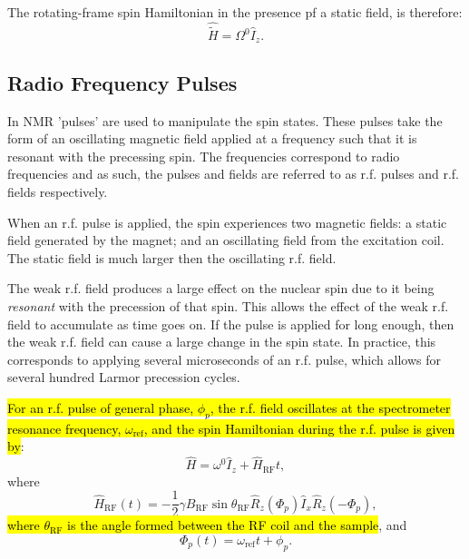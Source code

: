 The rotating-frame spin Hamiltonian in the presence pf a static field, is therefore:
\begin{equation}
  \hat{\tilde{H}} = \Omega^0\hat{I}_z.
\end{equation}

\subsection{Radio Frequency Pulses}

In NMR 'pulses' are used to manipulate the spin states. These pulses take the form
of an oscillating magnetic field applied at a frequency such that it is resonant with
the precessing spin. The frequencies correspond to radio frequencies and as such, the pulses and
fields are referred to as r.f. pulses and r.f. fields respectively.

When an r.f. pulse is applied, the spin experiences two magnetic fields: a static field generated
by the magnet; and an oscillating field from the excitation coil. The static field is much larger
then the oscillating r.f. field.

The weak r.f. field produces a large effect on the nuclear spin due to it being \textit{resonant}
with the precession of that spin. This allows the effect of the weak r.f. field to accumulate
as time goes on. If the pulse is applied for long enough, then the weak r.f. field can cause a
large change in the spin state. In practice, this corresponds to applying several microseconds
of an r.f. pulse, which allows for several hundred Larmor precession cycles.

\hl{For an r.f. pulse of general  phase, $\phi_p$, the r.f. field oscillates at the spectrometer resonance frequency, $\omega_{\text{ref}}$, and the spin Hamiltonian
during the r.f. pulse is given by}:
\begin{equation}
  \hat{H} = \omega^0\hat{I}_z + \hat{H}_{\text{RF}}{t},
\end{equation}
where
\begin{equation}
  \hat{H}_{\text{RF}}(t) = -\frac{1}{2}\gamma{B_{\text{RF}}}\sin{\theta_{\text{RF}}}\hat{R}_z(\Phi_p)\hat{I}_x\hat{R}_z(-\Phi_p),
\end{equation}
\hl{where $\theta_{\text{RF}}$ is the angle formed between the RF coil and the sample}, and
\begin{equation}
  \Phi_p(t) = \omega_{\text{ref}}t + \phi_p.
\end{equation}

